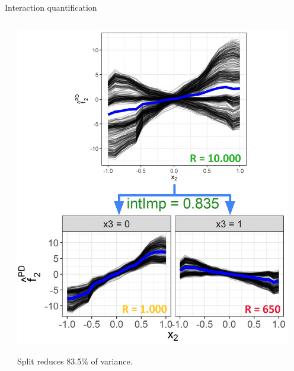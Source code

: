\documentclass[11pt,compress,t,notes=noshow, aspectratio=169, xcolor=table,dvipsnames]{beamer}
\begin{document}
\begin{frame}{Interaction quantification}
\begin{columns}[T, totalwidth=\textwidth]
\begin{column}{0.59\textwidth}
\begin{center}
\end{center}
    \end{column}
\pause
    \begin{column}{0.4\textwidth}
 \centering
\includegraphics[width = 0.95\textwidth]{figure/sim1_fake.png}

Split reduces 83.5\% of variance.
    \end{column}
\end{columns}

\end{frame}
\end{document}
